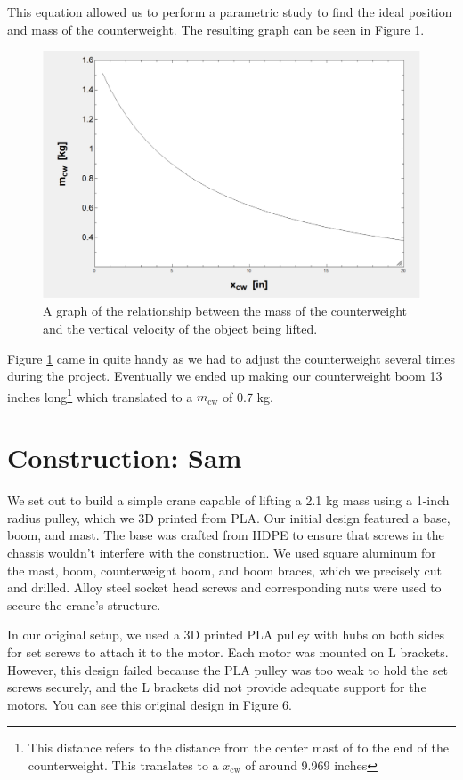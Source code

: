\documentclass[letterpaper, 12pt]{article}
\begin{document}
This equation allowed us to perform a parametric study to find the ideal position and mass of the counterweight. The resulting graph can be seen in Figure \ref{fig:Counter Weight.png}.
\begin{figure}[H]
    \centering
    \includegraphics[width =.55\linewidth]{Counter Weight.png}
    \caption{A graph of the relationship between the mass of the counterweight and the vertical velocity of the object being lifted.}
    \label{fig:Counter Weight.png}
\end{figure}

Figure \ref{fig:Counter Weight.png} came in quite handy as we had to adjust the counterweight several times during the project.
Eventually we ended up making our counterweight boom 13 inches long\footnote{This distance refers to the distance from the center mast of to the end of the counterweight. This translates to a $x_{\text{cw}}$ of around 9.969 inches} which translated to a $m_{\text{cw}}$ of 0.7 kg.

\section{Construction: Sam }
We set out to build a simple crane capable of lifting a 2.1 kg mass using a 1-inch radius pulley, which we 3D printed from PLA. Our initial design featured a base, boom, and mast. The base was crafted from HDPE to ensure that screws in the chassis wouldn’t interfere with the construction. We used square aluminum for the mast, boom, counterweight boom, and boom braces, which we precisely cut and drilled. Alloy steel socket head screws and corresponding nuts were used to secure the crane's structure.

In our original setup, we used a 3D printed PLA pulley with hubs on both sides for set screws to attach it to the motor. Each motor was mounted on L brackets. However, this design failed because the PLA pulley was too weak to hold the set screws securely, and the L brackets did not provide adequate support for the motors. You can see this original design in Figure 6.
\end{document}
